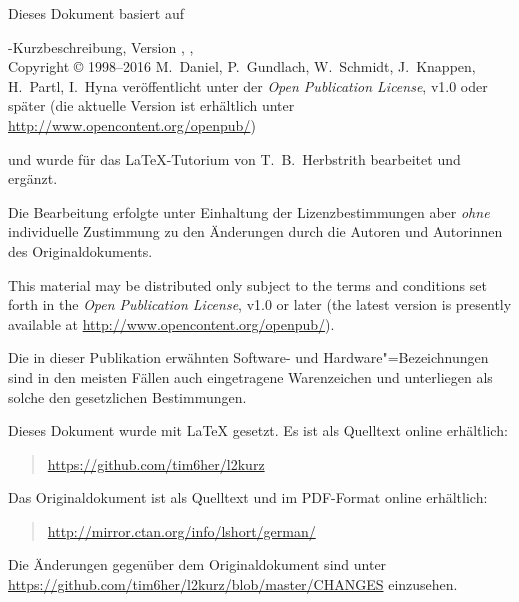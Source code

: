 {\parindent=0cm\thispagestyle{empty}

Dieses Dokument basiert auf
\bigskip

\sbLaTeXe-Kurzbeschreibung, Version \lkver, \lkdate,\\
Copyright \copyright{} 1998--2016 M.~Daniel, P.~Gundlach, W.~Schmidt, J.~Knappen, H.~Partl, I.~Hyna veröffentlicht unter der \emph{Open Publication License}, v1.0 oder später (die aktuelle Version ist erhältlich unter
\url{http://www.opencontent.org/openpub/})
\bigskip

und wurde für das \LaTeX-Tutorium von T.~B.~Herbstrith bearbeitet und ergänzt.

Die Bearbeitung erfolgte unter Einhaltung der Lizenzbestimmungen aber \emph{ohne} individuelle Zustimmung zu den Änderungen durch die Autoren und Autorinnen des Originaldokuments.
\bigskip

{
This material may be distributed only subject to the terms and
conditions set forth in the \emph{Open Publication License}, v1.0 or
later (the latest version is presently available at
\url{http://www.opencontent.org/openpub/}).}


\bigskip

Die in dieser Publikation erwähnten Software- und Hardware"=Bezeichnungen sind
in den meisten Fällen auch eingetragene Warenzeichen und unterliegen als
solche den gesetzlichen Bestimmungen.

\bigskip

\vfill

Dieses Dokument wurde mit \LaTeX{} gesetzt.
Es ist als Quelltext online erhältlich:
\begin{quote}
\url{https://github.com/tim6her/l2kurz}
\end{quote}

\bigskip

Das Originaldokument ist als Quelltext und im PDF-Format online erhältlich:
\begin{quote}
\url{http://mirror.ctan.org/info/lshort/german/}
\end{quote}
Die Änderungen gegenüber dem Originaldokument sind unter \url{https://github.com/tim6her/l2kurz/blob/master/CHANGES} einzusehen.

}

